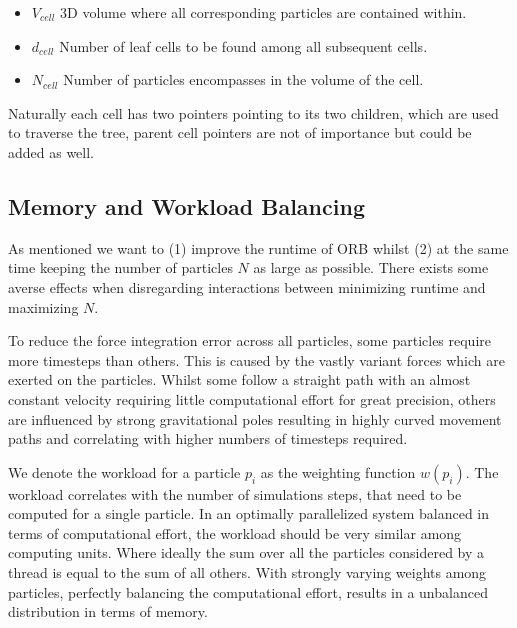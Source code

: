 \documentclass[]{article}
\begin{document}
\begin{itemize}
	\item \textbf{$V_{cell}$} 3D volume where all corresponding particles are contained within.
	\item \textbf{$d_{cell}$} Number of leaf cells to be found among all subsequent cells.
	\item \textbf{$N_{cell}$} Number of particles encompasses in the volume of the cell. 
\end{itemize}

Naturally each cell has two pointers pointing to its two children, which are used to traverse the tree, parent cell pointers are not of importance but could be added as well.

\subsection{Memory and Workload Balancing}\label{balancing}
As mentioned we want to (1) improve the runtime of ORB whilst (2) at the same time keeping the number of particles $N$ as large as possible. There exists some averse effects when disregarding interactions between minimizing runtime and maximizing $N$.

To reduce the force integration error across all particles, some particles require more timesteps than others. This is caused by the vastly variant forces which are exerted on the particles. Whilst some follow a straight path with an almost constant velocity requiring little computational effort for great precision, others are influenced by strong gravitational poles resulting in highly curved movement paths and correlating with higher numbers of timesteps required.

We denote the workload for a particle $p_i$ as the weighting function $w(p_i)$. The workload correlates with the number of simulations steps, that need to be computed for a single particle. In an optimally parallelized system balanced in terms of computational effort, the workload should be very similar among computing units. Where ideally the sum over all the particles considered by a thread is equal to the sum of all others. With strongly varying weights among particles, perfectly balancing the computational effort, results in a unbalanced distribution in terms of memory. 
\end{document}
